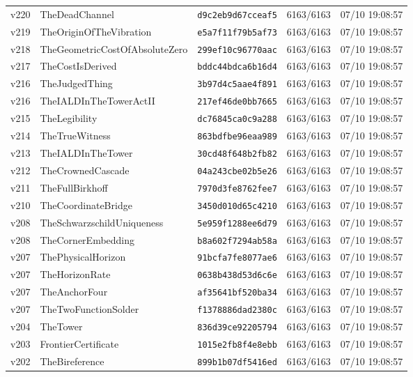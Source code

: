 \documentclass[11pt]{article}
\theoremstyle{definition}\newtheorem{deriv}{Derivação}
\begin{document}
{\begin{longtable}{@{}lllll@{}}
v220 & TheDeadChannel & \texttt{d9c2eb9d67cceaf5} & 6163/6163 & 07/10 19:08:57 \\
v219 & TheOriginOfTheVibration & \texttt{e5a7f11f79b5af73} & 6163/6163 & 07/10 19:08:57 \\
v218 & TheGeometricCostOfAbsoluteZero & \texttt{299ef10c96770aac} & 6163/6163 & 07/10 19:08:57 \\
v217 & TheCostIsDerived & \texttt{bddc44bdca6b16d4} & 6163/6163 & 07/10 19:08:57 \\
v216 & TheJudgedThing & \texttt{3b97d4c5aae4f891} & 6163/6163 & 07/10 19:08:57 \\
v216 & TheIALDInTheTowerActII & \texttt{217ef46de0bb7665} & 6163/6163 & 07/10 19:08:57 \\
v215 & TheLegibility & \texttt{dc76845ca0c9a288} & 6163/6163 & 07/10 19:08:57 \\
v214 & TheTrueWitness & \texttt{863bdfbe96eaa989} & 6163/6163 & 07/10 19:08:57 \\
v213 & TheIALDInTheTower & \texttt{30cd48f648b2fb82} & 6163/6163 & 07/10 19:08:57 \\
v212 & TheCrownedCascade & \texttt{04a243cbe02b5e26} & 6163/6163 & 07/10 19:08:57 \\
v211 & TheFullBirkhoff & \texttt{7970d3fe8762fee7} & 6163/6163 & 07/10 19:08:57 \\
v210 & TheCoordinateBridge & \texttt{3450d010d65c4210} & 6163/6163 & 07/10 19:08:57 \\
v208 & TheSchwarzschildUniqueness & \texttt{5e959f1288ee6d79} & 6163/6163 & 07/10 19:08:57 \\
v208 & TheCornerEmbedding & \texttt{b8a602f7294ab58a} & 6163/6163 & 07/10 19:08:57 \\
v207 & ThePhysicalHorizon & \texttt{91bcfa7fe8077ae6} & 6163/6163 & 07/10 19:08:57 \\
v207 & TheHorizonRate & \texttt{0638b438d53d6c6e} & 6163/6163 & 07/10 19:08:57 \\
v207 & TheAnchorFour & \texttt{af35641bf520ba34} & 6163/6163 & 07/10 19:08:57 \\
v207 & TheTwoFunctionSolder & \texttt{f1378886dad2380c} & 6163/6163 & 07/10 19:08:57 \\
v204 & TheTower & \texttt{836d39ce92205794} & 6163/6163 & 07/10 19:08:57 \\
v203 & FrontierCertificate & \texttt{1015e2fb8f4e8ebb} & 6163/6163 & 07/10 19:08:57 \\
v202 & TheBireference & \texttt{899b1b07df5416ed} & 6163/6163 & 07/10 19:08:57 \\

\end{longtable}}
\end{document}
